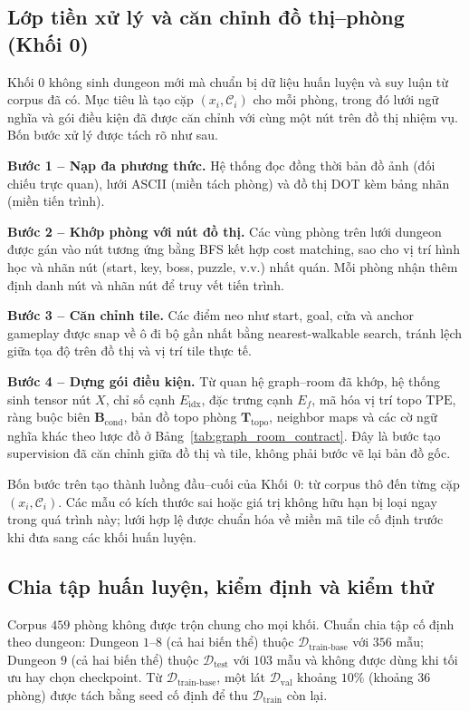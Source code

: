 \documentclass[oneside,a4paper,12pt]{extreport}
\begin{document}
\subsection{Lớp tiền xử lý và căn chỉnh đồ thị--phòng (Khối 0)}
Khối 0 không sinh dungeon mới mà chuẩn bị dữ liệu huấn luyện và suy luận từ corpus đã có. Mục tiêu là tạo cặp $(x_i,\mathcal{C}_i)$ cho mỗi phòng, trong đó lưới ngữ nghĩa và gói điều kiện đã được căn chỉnh với cùng một nút trên đồ thị nhiệm vụ. Bốn bước xử lý được tách rõ như sau.

\textbf{Bước 1 -- Nạp đa phương thức.} Hệ thống đọc đồng thời bản đồ ảnh (đối chiếu trực quan), lưới ASCII (miền tách phòng) và đồ thị DOT kèm bảng nhãn (miền tiến trình).

\textbf{Bước 2 -- Khớp phòng với nút đồ thị.} Các vùng phòng trên lưới dungeon được gán vào nút tương ứng bằng BFS kết hợp cost matching, sao cho vị trí hình học và nhãn nút (start, key, boss, puzzle, v.v.) nhất quán. Mỗi phòng nhận thêm định danh nút và nhãn nút để truy vết tiến trình.

\textbf{Bước 3 -- Căn chỉnh tile.} Các điểm neo như start, goal, cửa và anchor gameplay được snap về ô đi bộ gần nhất bằng nearest-walkable search, tránh lệch giữa tọa độ trên đồ thị và vị trí tile thực tế.

\textbf{Bước 4 -- Dựng gói điều kiện.} Từ quan hệ graph--room đã khớp, hệ thống sinh tensor nút $X$, chỉ số cạnh $E_{\mathrm{idx}}$, đặc trưng cạnh $E_f$, mã hóa vị trí topo $\mathrm{TPE}$, ràng buộc biên $\mathbf{B}_{\text{cond}}$, bản đồ topo phòng $\mathbf{T}_{\text{topo}}$, neighbor maps và các cờ ngữ nghĩa khác theo lược đồ ở Bảng~\ref{tab:graph_room_contract}. Đây là bước tạo supervision đã căn chỉnh giữa đồ thị và tile, không phải bước vẽ lại bản đồ gốc.

Bốn bước trên tạo thành luồng đầu--cuối của Khối~0: từ corpus thô đến từng cặp $(x_i,\mathcal{C}_i)$. Các mẫu có kích thước sai hoặc giá trị không hữu hạn bị loại ngay trong quá trình này; lưới hợp lệ được chuẩn hóa về miền mã tile cố định trước khi đưa sang các khối huấn luyện.

\subsection{Chia tập huấn luyện, kiểm định và kiểm thử}
Corpus $459$ phòng không được trộn chung cho mọi khối. Chuẩn chia tập cố định theo dungeon: Dungeon $1$--$8$ (cả hai biến thể) thuộc $\mathcal{D}_{\text{train-base}}$ với $356$ mẫu; Dungeon $9$ (cả hai biến thể) thuộc $\mathcal{D}_{\text{test}}$ với $103$ mẫu và không được dùng khi tối ưu hay chọn checkpoint. Từ $\mathcal{D}_{\text{train-base}}$, một lát $\mathcal{D}_{\text{val}}$ khoảng $10\%$ (khoảng $36$ phòng) được tách bằng seed cố định để thu $\mathcal{D}_{\text{train}}$ còn lại.
\end{document}
